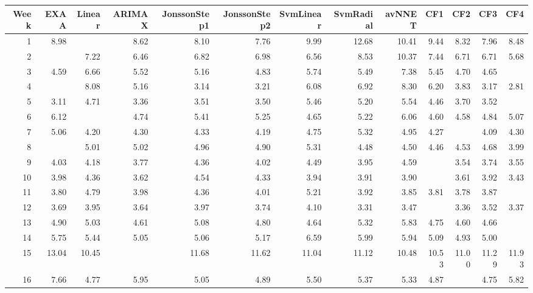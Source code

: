 \begin{tabular}{rrrrrrrrrrrrr}
  \hline
Week & EXAA & Linear & ARIMAX & JonssonStep1 & JonssonStep2 & SvmLinear & SvmRadial & avNNET & CF1 & CF2 & CF3 & CF4 \\ 
  \hline
1 & 8.98 & \color{blue}{7.49} & 8.62 & 8.10 & 7.76 & 9.99 & 12.68 & 10.41 & 9.44 & 8.32 & 7.96 & 8.48 \\ 
  2 & \color{blue}{5.19} & 7.22 & 6.46 & 6.82 & 6.98 & 6.56 & 8.53 & 10.37 & 7.44 & 6.71 & 6.71 & 5.68 \\ 
  3 & 4.59 & 6.66 & 5.52 & 5.16 & 4.83 & 5.74 & 5.49 & 7.38 & 5.45 & 4.70 & 4.65 & \color{blue}{4.30} \\ 
  4 & \color{blue}{2.68} & 8.08 & 5.16 & 3.14 & 3.21 & 6.08 & 6.92 & 8.30 & 6.20 & 3.83 & 3.17 & 2.81 \\ 
  5 & 3.11 & 4.71 & 3.36 & 3.51 & 3.50 & 5.46 & 5.20 & 5.54 & 4.46 & 3.70 & 3.52 & \color{blue}{2.90} \\ 
  6 & 6.12 & \color{blue}{4.44} & 4.74 & 5.41 & 5.25 & 4.65 & 5.22 & 6.06 & 4.60 & 4.58 & 4.84 & 5.07 \\ 
  7 & 5.06 & 4.20 & 4.30 & 4.33 & 4.19 & 4.75 & 5.32 & 4.95 & 4.27 & \color{blue}{4.07} & 4.09 & 4.30 \\ 
  8 & \color{blue}{3.97} & 5.01 & 5.02 & 4.96 & 4.90 & 5.31 & 4.48 & 4.50 & 4.46 & 4.53 & 4.68 & 3.99 \\ 
  9 & 4.03 & 4.18 & 3.77 & 4.36 & 4.02 & 4.49 & 3.95 & 4.59 & \color{blue}{3.49} & 3.54 & 3.74 & 3.55 \\ 
  10 & 3.98 & 4.36 & 3.62 & 4.54 & 4.33 & 3.94 & 3.91 & 3.90 & \color{blue}{3.40} & 3.61 & 3.92 & 3.43 \\ 
  11 & 3.80 & 4.79 & 3.98 & 4.36 & 4.01 & 5.21 & 3.92 & 3.85 & 3.81 & 3.78 & 3.87 & \color{blue}{3.50} \\ 
  12 & 3.69 & 3.95 & 3.64 & 3.97 & 3.74 & 4.10 & 3.31 & 3.47 & \color{blue}{3.24} & 3.36 & 3.52 & 3.37 \\ 
  13 & 4.90 & 5.03 & 4.61 & 5.08 & 4.80 & 4.64 & 5.32 & 5.83 & 4.75 & 4.60 & 4.66 & \color{blue}{4.48} \\ 
  14 & 5.75 & 5.44 & 5.05 & 5.06 & 5.17 & 6.59 & 5.99 & 5.94 & 5.09 & 4.93 & 5.00 & \color{blue}{4.86} \\ 
  15 & 13.04 & 10.45 & \color{blue}{10.19} & 11.68 & 11.62 & 11.04 & 11.12 & 10.48 & 10.53 & 11.00 & 11.29 & 11.93 \\ 
  16 & 7.66 & 4.77 & 5.95 & 5.05 & 4.89 & 5.50 & 5.37 & 5.33 & 4.87 & \color{blue}{4.69} & 4.75 & 5.82 \\ 

\end{tabular}
